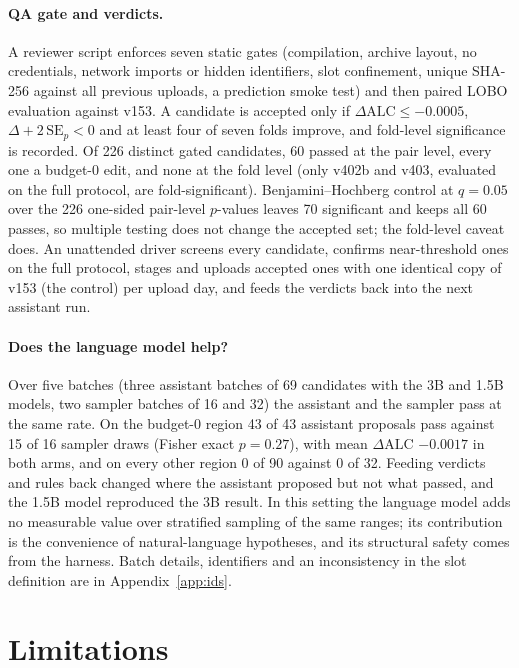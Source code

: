 \documentclass{article}
\begin{document}
\paragraph{QA gate and verdicts.} A reviewer script enforces seven static gates (compilation, archive layout, no credentials, network imports or hidden identifiers, slot confinement, unique SHA-256 against all previous uploads, a prediction smoke test) and then paired LOBO evaluation against v153. A candidate is accepted only if $\Delta\text{ALC}\le-0.0005$, $\Delta+2\,\text{SE}_p<0$ and at least four of seven folds improve, and fold-level significance is recorded. Of 226 distinct gated candidates, 60 passed at the pair level, every one a budget-0 edit, and none at the fold level (only v402b and v403, evaluated on the full protocol, are fold-significant). Benjamini--Hochberg control at $q=0.05$ over the 226 one-sided pair-level $p$-values leaves 70 significant and keeps all 60 passes, so multiple testing does not change the accepted set; the fold-level caveat does. An unattended driver screens every candidate, confirms near-threshold ones on the full protocol, stages and uploads accepted ones with one identical copy of v153 (the control) per upload day, and feeds the verdicts back into the next assistant run.

\paragraph{Does the language model help?} Over five batches (three assistant batches of 69 candidates with the 3B and 1.5B models, two sampler batches of 16 and 32) the assistant and the sampler pass at the same rate. On the budget-0 region 43 of 43 assistant proposals pass against 15 of 16 sampler draws (Fisher exact $p=0.27$), with mean $\Delta\text{ALC}$ $-0.0017$ in both arms, and on every other region 0 of 90 against 0 of 32. Feeding verdicts and rules back changed where the assistant proposed but not what passed, and the 1.5B model reproduced the 3B result. In this setting the language model adds no measurable value over stratified sampling of the same ranges; its contribution is the convenience of natural-language hypotheses, and its structural safety comes from the harness. Batch details, identifiers and an inconsistency in the slot definition are in Appendix~\ref{app:ids}.

\section{Limitations}
\label{sec:limits}
\end{document}
